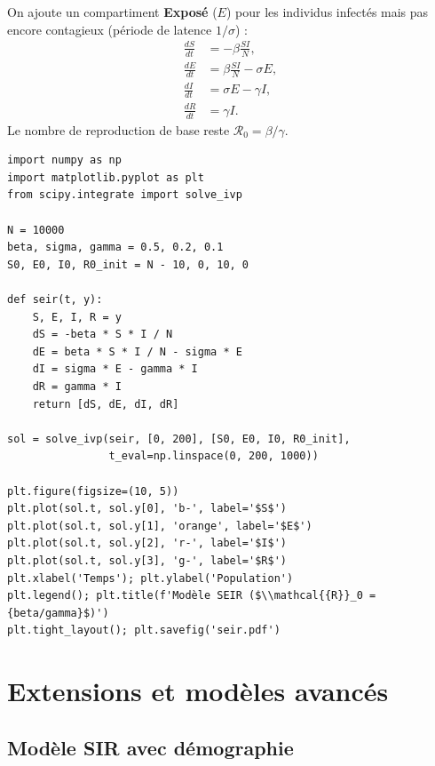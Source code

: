\begin{definition}
On ajoute un compartiment \textbf{Expos\'e} ($E$) pour les individus
infect\'es mais pas encore contagieux (p\'eriode de latence $1/\sigma$) :
\begin{align}
  \frac{dS}{dt} &= -\beta\frac{SI}{N}, \\
  \frac{dE}{dt} &= \beta\frac{SI}{N} - \sigma E, \\
  \frac{dI}{dt} &= \sigma E - \gamma I, \\
  \frac{dR}{dt} &= \gamma I.
\end{align}
Le nombre de reproduction de base reste $\mathcal{R}_0 = \beta/\gamma$.
\end{definition}

\begin{codeblock}[title=\textbf{Simulation du mod\`ele SEIR}]
\begin{verbatim}
import numpy as np
import matplotlib.pyplot as plt
from scipy.integrate import solve_ivp

N = 10000
beta, sigma, gamma = 0.5, 0.2, 0.1
S0, E0, I0, R0_init = N - 10, 0, 10, 0

def seir(t, y):
    S, E, I, R = y
    dS = -beta * S * I / N
    dE = beta * S * I / N - sigma * E
    dI = sigma * E - gamma * I
    dR = gamma * I
    return [dS, dE, dI, dR]

sol = solve_ivp(seir, [0, 200], [S0, E0, I0, R0_init],
                t_eval=np.linspace(0, 200, 1000))

plt.figure(figsize=(10, 5))
plt.plot(sol.t, sol.y[0], 'b-', label='$S$')
plt.plot(sol.t, sol.y[1], 'orange', label='$E$')
plt.plot(sol.t, sol.y[2], 'r-', label='$I$')
plt.plot(sol.t, sol.y[3], 'g-', label='$R$')
plt.xlabel('Temps'); plt.ylabel('Population')
plt.legend(); plt.title(f'Modèle SEIR ($\\mathcal{{R}}_0 = {beta/gamma}$)')
plt.tight_layout(); plt.savefig('seir.pdf')
\end{verbatim}
\end{codeblock}

\section{Extensions et mod\`eles avanc\'es}

\subsection{Mod\`ele SIR avec d\'emographie}

